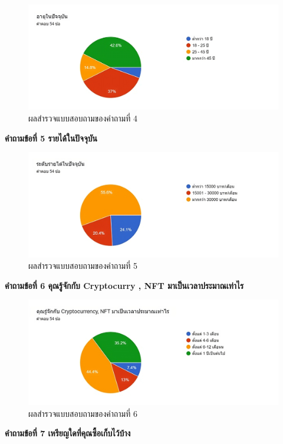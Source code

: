 \documentclass[12pt,oneside,openright,a4paper]{cpe-thai-project}
\begin{document}
\begin{figure}[!thb]
			\centering
			\includegraphics[scale=0.4]{apprex4}
			\caption{ผลสำรวจแบบสอบถามของคำถามที่ 4}
		\end{figure}
\FloatBarrier
\bf คำถามข้อที่ 5 รายได้ในปัจจุบัน\\
\begin{figure}[!thb]
			\centering
			\includegraphics[scale=0.4]{apprex5}
			\caption{ผลสำรวจแบบสอบถามของคำถามที่ 5}
		\end{figure}
\FloatBarrier
\bf คำถามข้อที่ 6  คุณรู้จักกับ Cryptocurry , NFT มาเป็นเวลาประมาณเท่าไร\\
\begin{figure}[!thb]
			\centering
			\includegraphics[scale=0.4]{apprex6}
			\caption{ผลสำรวจแบบสอบถามของคำถามที่ 6}
		\end{figure}
\FloatBarrier
\bf คำถามข้อที่ 7 เหรียญใดที่คุณซื้อเก็บไว้บ้าง\\
\end{document}
